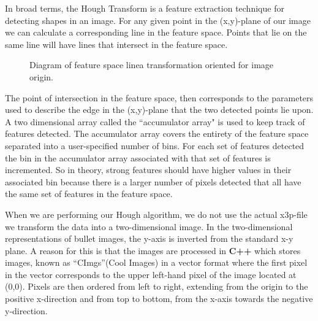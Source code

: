 \documentclass[12pt]{article}\usepackage[]{graphicx}\usepackage[]{color}
\theoremstyle{nonumberplain}
\begin{document}
In broad terms, the Hough Transform is a feature extraction technique for detecting shapes in an image. For any given point in the (x,y)-plane of our image we can calculate a corresponding line in the feature space. Points that lie on the same line will have lines that intersect in the feature space. 
\begin{figure}[!ht]
\begin{subfigure}{.5\textwidth}
\centering
{}
\label{fig:tikz1}
\end{subfigure}
\begin{subfigure}{.5\textwidth}
\centering
{}
\label{fig:tikz2}
\end{subfigure}
\caption{Diagram of feature space linea transformation oriented for image origin.}
\label{fig:parametrization}
\end{figure}


The point of intersection in the feature space, then corresponds to the parameters used to describe the edge in the (x,y)-plane that the two detected points lie upon. A two dimensional array called the ``accumulator array" is used to keep track of features detected.  The accumulator array covers the entirety of the feature space separated into a user-specified number of bins. For each set of features detected the bin in the accumulator array associated with that set of features is incremented. So in theory, strong features should have higher values in their associated bin because there is a larger number of pixels detected that all have the same set of features in the feature space. 

 When we are performing our Hough algorithm, we do not use the actual x3p-file we transform the data into a two-dimensional image. In the two-dimensional representations of bullet images, the y-axis is inverted from the standard x-y plane. A reason for this is that the images are processed in \textbf{C++} which stores images, known as ``CImgs''(Cool Images) in a vector format where the first pixel in the vector corresponds to the upper left-hand pixel of the image located at (0,0). Pixels are then ordered from left to right, extending from the origin to the positive x-direction and from top to bottom, from the x-axis towards the negative y-direction.
 
\end{document}
